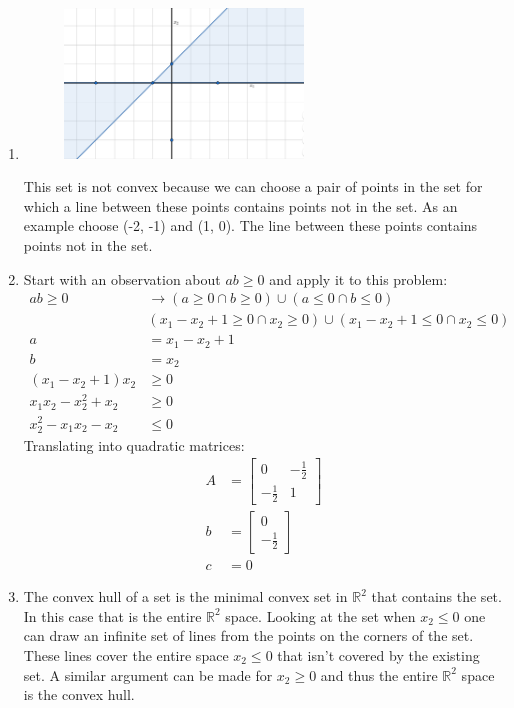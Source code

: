 \documentclass[11pt]{article}
\begin{document}
\begin{solution}
\begin{enumerate}
    \item
    \begin{figure}[H]
        \centerline{\includegraphics[width=0.6\textwidth]{problem1_set.png}}
    \end{figure}
    This set is not convex because we can choose a pair of points in the set for which a line between these points contains points not in the set. As an example choose (-2, -1) and (1, 0). The line between these points contains points not in the set.

    \item Start with an observation about $ab \geq 0$ and apply it to this problem:
    \begin{align*}
        ab \geq 0 &\rightarrow (a \geq 0 \cap b \geq 0) \cup (a \leq 0 \cap b \leq 0) \\
        &(x_1 - x_2 + 1 \geq 0 \cap x_2 \geq 0) \cup (x_1 - x_2 + 1 \leq 0 \cap x_2 \leq 0) \\
        a &= x_1 - x_2 + 1 \\
        b &= x_2 \\
        (x_1 - x_2 + 1) x_2 &\geq 0 \\
        x_1 x_2 - x_2^2 + x_2 &\geq 0 \\
        x_2^2 - x_1 x_2 - x_2 &\leq 0
    \end{align*}
    Translating into quadratic matrices:
    \begin{align*}
        A &= \begin{bmatrix} 0 & -\frac{1}{2} \\ -\frac{1}{2} & 1 \end{bmatrix} \\
        b &= \begin{bmatrix} 0 \\ -\frac{1}{2} \end{bmatrix} \\
        c &= 0
    \end{align*}

\item The convex hull of a set is the minimal convex set in $\mathbb{R}^2$ that contains the set. In this case that is the entire $\mathbb{R}^2$ space. Looking at the set when $x_2 \leq 0$ one can draw an infinite set of lines from the points on the corners of the set. These lines cover the entire space $x_2 \leq 0$ that isn't covered by the existing set. A similar argument can be made for $x_2 \geq 0$ and thus the entire $\mathbb{R}^2$ space is the convex hull.
\end{enumerate}
\end{solution}
\end{document}
